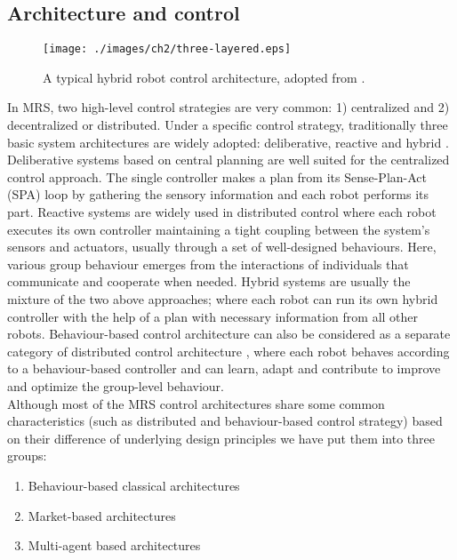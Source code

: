\subsection*{Architecture and control}
\label{bg:mrs:arch}
\begin{figure}
\begin{center}
\texttt{[image: ./images/ch2/three-layered.eps]} %
\caption{A typical hybrid robot control architecture, adopted from \protect{}.} 
\label{fig:three-layer-arch}
\end{center}
\end{figure}
In MRS, two high-level control strategies are very common: 1) centralized and 2) decentralized or distributed. Under a specific control strategy, traditionally three basic system architectures are widely adopted: deliberative, reactive and hybrid \cite{Mataric2007,Arkin1998}. Deliberative systems based on central planning are well suited for the centralized control approach. The single controller makes a plan from its Sense-Plan-Act (SPA) loop by gathering the sensory information and each robot performs its part. Reactive systems are widely used in distributed control where each robot executes its own controller maintaining a tight coupling between the system's sensors and actuators, usually through a set of well-designed behaviours. Here, various group behaviour emerges from the interactions of individuals that communicate and cooperate when needed. Hybrid systems are usually the mixture of the two above approaches; where each robot can run its own hybrid controller with the help of a plan with necessary information from all other robots. Behaviour-based control architecture can also be considered as a separate category of distributed control architecture \cite{Mataric2007}, where each robot behaves according to a behaviour-based controller and can learn, adapt and contribute to improve and optimize the group-level behaviour.\\ 
Although most of the MRS control architectures share some common characteristics (such as distributed and behaviour-based control strategy) based on their difference of underlying design principles we have put them into three groups:
\begin{enumerate}
\item Behaviour-based classical architectures
\item Market-based architectures
\item Multi-agent based architectures
\end{enumerate}
